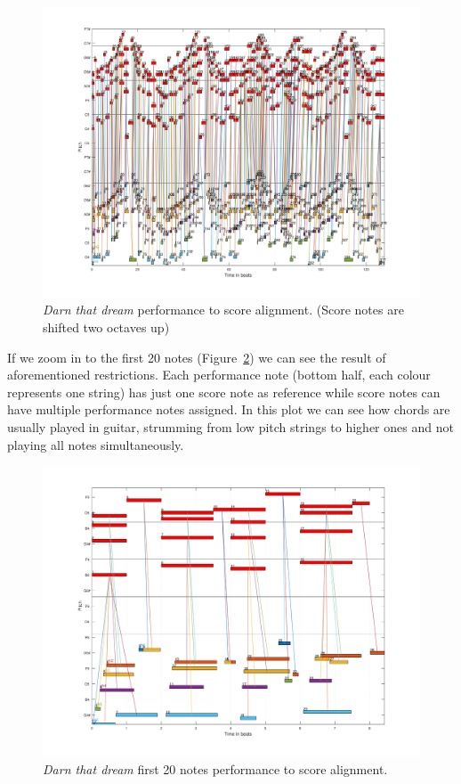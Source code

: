 \begin{figure}[ht!]
\centering
\includegraphics[width=\textwidth]{Figures/Darn_that_dream_auto.pdf}
\caption[\textit{Darn that dream} performance to score alignment.]{\textit{Darn that dream} performance to score alignment. (Score notes are shifted two octaves up)}
\label{fig:darn_auto_alignment}
\end{figure}

If we zoom in to the first 20 notes (Figure~\ref{fig:darn_20n}) we can see the result of aforementioned restrictions. Each performance note (bottom half, each colour represents one string) has just one score note as reference while score notes can have multiple performance notes assigned. In this plot we can see how chords are usually played in guitar, strumming from low pitch strings to higher ones and not playing all notes simultaneously.

\begin{figure}[ht!]
\centering
\includegraphics[width=\textwidth]{Figures/Darn_8b_autoalign.pdf}
\caption{\textit{Darn that dream} first 20 notes performance to score alignment.}
\label{fig:darn_20n}
\end{figure}



